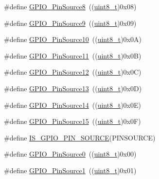 \begin{DoxyCompactItemize}
\item 
\#define \hyperlink{group___g_p_i_o___pin__sources_ga6f5962c5b2ce5734734563bdad18fbd6}{G\+P\+I\+O\+\_\+\+Pin\+Source8}~((\hyperlink{_p_e___types_8h_aba7bc1797add20fe3efdf37ced1182c5}{uint8\+\_\+t})0x08)
\item 
\#define \hyperlink{group___g_p_i_o___pin__sources_gabaaed5961f2b9862082f74e18f5c3f0e}{G\+P\+I\+O\+\_\+\+Pin\+Source9}~((\hyperlink{_p_e___types_8h_aba7bc1797add20fe3efdf37ced1182c5}{uint8\+\_\+t})0x09)
\item 
\#define \hyperlink{group___g_p_i_o___pin__sources_gacec97d9c2d319b450f699adff6430c86}{G\+P\+I\+O\+\_\+\+Pin\+Source10}~((\hyperlink{_p_e___types_8h_aba7bc1797add20fe3efdf37ced1182c5}{uint8\+\_\+t})0x0\+A)
\item 
\#define \hyperlink{group___g_p_i_o___pin__sources_ga446be4a99e84eefb5c71a643211f598b}{G\+P\+I\+O\+\_\+\+Pin\+Source11}~((\hyperlink{_p_e___types_8h_aba7bc1797add20fe3efdf37ced1182c5}{uint8\+\_\+t})0x0\+B)
\item 
\#define \hyperlink{group___g_p_i_o___pin__sources_gaaa64892c00d50b0fa49f0ce72a83e6e0}{G\+P\+I\+O\+\_\+\+Pin\+Source12}~((\hyperlink{_p_e___types_8h_aba7bc1797add20fe3efdf37ced1182c5}{uint8\+\_\+t})0x0\+C)
\item 
\#define \hyperlink{group___g_p_i_o___pin__sources_gace4beb385facd306324fa9e362df5fda}{G\+P\+I\+O\+\_\+\+Pin\+Source13}~((\hyperlink{_p_e___types_8h_aba7bc1797add20fe3efdf37ced1182c5}{uint8\+\_\+t})0x0\+D)
\item 
\#define \hyperlink{group___g_p_i_o___pin__sources_ga5fbb540a86af4015a46ac16c61ddb1f7}{G\+P\+I\+O\+\_\+\+Pin\+Source14}~((\hyperlink{_p_e___types_8h_aba7bc1797add20fe3efdf37ced1182c5}{uint8\+\_\+t})0x0\+E)
\item 
\#define \hyperlink{group___g_p_i_o___pin__sources_ga9b29d9a9ecb1579ecedf4ea53ccbfd5b}{G\+P\+I\+O\+\_\+\+Pin\+Source15}~((\hyperlink{_p_e___types_8h_aba7bc1797add20fe3efdf37ced1182c5}{uint8\+\_\+t})0x0\+F)
\item 
\#define \hyperlink{group___g_p_i_o___pin__sources_ga689e4e72591136b6a8d4df9d895181f7}{I\+S\+\_\+\+G\+P\+I\+O\+\_\+\+P\+I\+N\+\_\+\+S\+O\+U\+R\+CE}(P\+I\+N\+S\+O\+U\+R\+CE)
\item 
\#define \hyperlink{group___g_p_i_o___pin__sources_ga028bcbdf5a7fd81ec45830f60a022bb4}{G\+P\+I\+O\+\_\+\+Pin\+Source0}~((\hyperlink{_p_e___types_8h_aba7bc1797add20fe3efdf37ced1182c5}{uint8\+\_\+t})0x00)
\item 
\#define \hyperlink{group___g_p_i_o___pin__sources_gad02324cdd8526a7aacd15a5a910d56f1}{G\+P\+I\+O\+\_\+\+Pin\+Source1}~((\hyperlink{_p_e___types_8h_aba7bc1797add20fe3efdf37ced1182c5}{uint8\+\_\+t})0x01)

\end{DoxyCompactItemize}

